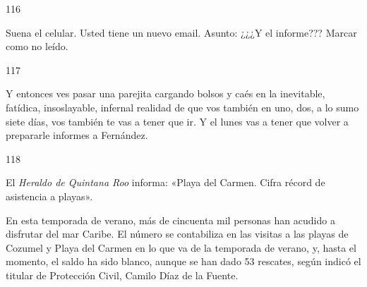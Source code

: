 \documentclass[12pt,twoside,openright,a5paper]{book}
\begin{document}
\vspace{0.5cm}

\hrulefill \hspace{0.1cm}\decofourleft\hspace{0.2cm} 116 \hspace{0.2cm}\decofourright \hspace{0.1cm}\hrulefill

\nopagebreak

\vspace{0.5cm}

\nopagebreak

Suena el celular. Usted tiene un nuevo email. Asunto: ¿¿¿Y el informe??? Marcar como no leído.


\vspace{0.5cm}

\hrulefill \hspace{0.1cm}\decofourleft\hspace{0.2cm} 117 \hspace{0.2cm}\decofourright \hspace{0.1cm}\hrulefill

\nopagebreak

\vspace{0.5cm}

\nopagebreak

Y entonces ves pasar una parejita cargando bolsos y caés en la
inevitable, fatídica, insoslayable, infernal realidad de que vos también en
uno, dos, a lo sumo siete días, vos también te vas a tener que ir. Y
el lunes vas a tener que volver a prepararle informes a Fernández.

\vspace{0.5cm}

\hrulefill \hspace{0.1cm}\decofourleft\hspace{0.2cm} 118 \hspace{0.2cm}\decofourright \hspace{0.1cm}\hrulefill

\nopagebreak

\vspace{0.5cm}

\nopagebreak

El \emph{Heraldo de Quintana Roo} informa: «Playa del Carmen. Cifra récord de
asistencia a playas».

En esta temporada de verano, más de cincuenta mil personas
han acudido a disfrutar del mar Caribe. 
El número se contabiliza en las visitas a las playas de Cozumel y Playa
del Carmen en lo que va de la temporada de verano, y, hasta el momento, el
saldo ha sido blanco, aunque se han dado 53 rescates, según indicó el titular de
Protección Civil, Camilo Díaz de la Fuente.
\end{document}
